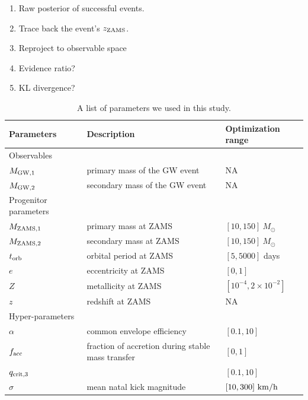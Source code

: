\documentclass[twocolumn]{aastex631}
\begin{document}
\begin{enumerate}
\item Raw posterior of successful events.
\item Trace back the event's $z_{\rm ZAMS}$.
\item Reproject to observable space
\item Evidence ratio?
\item KL divergence?
\end{enumerate}

\begin{table}[hbt!]
    \begin{center}
    \begin{tabular}{ l l l }
    \hline
    \hline
    Parameters &  Description & Optimization range\\
    \hline
    \hline
    Observables &\ &\  \\
    \hline
    \hline
    $M_{\rm GW,1}$ & primary mass of the GW event & NA \\
    $M_{\rm GW,2}$ & secondary mass of the GW event  & NA\\
    \hline
    \hline
    Progenitor parameters &\ &\  \\
    \hline
    \hline
    $M_{\rm ZAMS,1}$ & primary mass at ZAMS & $[10,150]\ M_{\odot}$\\
    $M_{\rm ZAMS,2}$ & secondary mass at ZAMS & $[10,150]\ M_{\odot}$\\
    $t_{\rm orb}$ & orbital period at ZAMS & $[5,5000]$ days\\
    $e$ & eccentricity at ZAMS & $[0,1]$\\
    $Z$ & metallicity at ZAMS & $[10^{-4},2\times10^{-2}]$\\
    $z$ & redshift at ZAMS & NA\\
    \hline
    \hline
    Hyper-parameters &\ &\ \\
    \hline
    \hline
    
    $\alpha$ & common envelope efficiency & $[0.1,10]$\\
    $f_{\rm acc}$ & fraction of accretion during stable mass transfer & $[0,1]$\\
    $q_{\rm crit,3}$ & & $[0.1,10]$\\
    $\sigma$ & mean natal kick magnitude & $[10,300]\ {\rm km/h}$\\


    \hline
    \hline
    \end{tabular}
    \caption{A list of parameters we used in this study.}
    \label{tab:parameters}
    \end{center}
\end{table}
    
\end{document}
